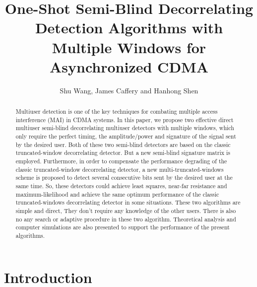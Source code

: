 \documentclass[a4paper,11pt,fleqn]{article}
\title{One-Shot Semi-Blind Decorrelating Detection Algorithms with Multiple Windows for Asynchronized CDMA}
\date{}
\author{Shu Wang, James Caffery and Hanhong Shen}
\begin{document}
\maketitle

\begin{abstract}
Multiuser detection is one of the key techniques for combating
multiple access interference (MAI) in CDMA systems. In this paper,
we propose two effective direct multiuser semi-blind decorrelating
multiuser detectors with multiple windows, which only require the
perfect timing, the amplitude/power and signature of the signal
sent by the desired user. Both of these two semi-blind detectors
are based on the classic truncated-window decorrelating detector.
But a new semi-blind signature matrix is employed. Furthermore, in
order to compensate the performance degrading of the classic
truncated-window decorrelating detector, a new
multi-truncated-windows scheme is proposed to detect several
consecutive bits sent by the desired user at the same time. So,
these detectors could achieve least squares, near-far resistance
and maximum-likelihood and achieve the same optimum performance of
the classic truncated-windows decorrelating detector in some
situations. These two algorithms are simple and direct, They don't
require any knowledge of the other users. There is also no any
search or adaptive procedure in these two algorithm. Theoretical
analysis and computer simulations are also presented to support
the performance of the present algorithms.
\end{abstract}

\section{Introduction}
\end{document}
